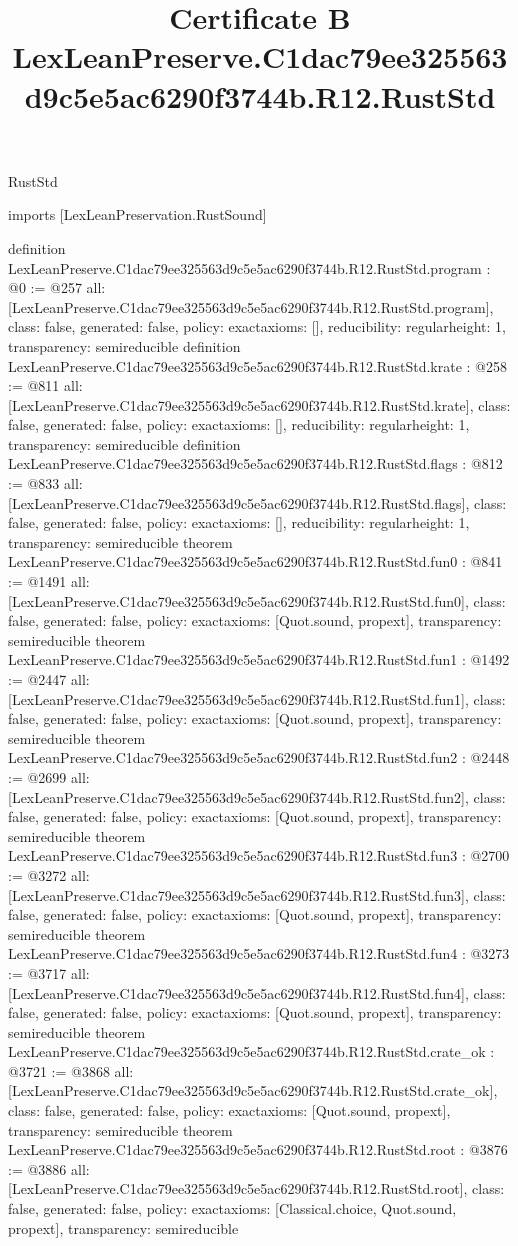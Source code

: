 \begin{lexlean}{RustStd}
\title{Certificate B LexLeanPreserve.C1dac79ee325563d9c5e5ac6290f3744b.R12.RustStd}
\begin{coremodule}
imports [LexLeanPreservation.RustSound]

definition LexLeanPreserve.C1dac79ee325563d9c5e5ac6290f3744b.R12.RustStd.program : @0 := @257 {
  all: [LexLeanPreserve.C1dac79ee325563d9c5e5ac6290f3744b.R12.RustStd.program],
  class: false,
  generated: false,
  policy: exact{axioms: []},
  reducibility: regular{height: 1},
  transparency: semireducible
}
definition LexLeanPreserve.C1dac79ee325563d9c5e5ac6290f3744b.R12.RustStd.krate : @258 := @811 {
  all: [LexLeanPreserve.C1dac79ee325563d9c5e5ac6290f3744b.R12.RustStd.krate],
  class: false,
  generated: false,
  policy: exact{axioms: []},
  reducibility: regular{height: 1},
  transparency: semireducible
}
definition LexLeanPreserve.C1dac79ee325563d9c5e5ac6290f3744b.R12.RustStd.flags : @812 := @833 {
  all: [LexLeanPreserve.C1dac79ee325563d9c5e5ac6290f3744b.R12.RustStd.flags],
  class: false,
  generated: false,
  policy: exact{axioms: []},
  reducibility: regular{height: 1},
  transparency: semireducible
}
theorem LexLeanPreserve.C1dac79ee325563d9c5e5ac6290f3744b.R12.RustStd.fun0 : @841 := @1491 {
  all: [LexLeanPreserve.C1dac79ee325563d9c5e5ac6290f3744b.R12.RustStd.fun0],
  class: false,
  generated: false,
  policy: exact{axioms: [Quot.sound, propext]},
  transparency: semireducible
}
theorem LexLeanPreserve.C1dac79ee325563d9c5e5ac6290f3744b.R12.RustStd.fun1 : @1492 := @2447 {
  all: [LexLeanPreserve.C1dac79ee325563d9c5e5ac6290f3744b.R12.RustStd.fun1],
  class: false,
  generated: false,
  policy: exact{axioms: [Quot.sound, propext]},
  transparency: semireducible
}
theorem LexLeanPreserve.C1dac79ee325563d9c5e5ac6290f3744b.R12.RustStd.fun2 : @2448 := @2699 {
  all: [LexLeanPreserve.C1dac79ee325563d9c5e5ac6290f3744b.R12.RustStd.fun2],
  class: false,
  generated: false,
  policy: exact{axioms: [Quot.sound, propext]},
  transparency: semireducible
}
theorem LexLeanPreserve.C1dac79ee325563d9c5e5ac6290f3744b.R12.RustStd.fun3 : @2700 := @3272 {
  all: [LexLeanPreserve.C1dac79ee325563d9c5e5ac6290f3744b.R12.RustStd.fun3],
  class: false,
  generated: false,
  policy: exact{axioms: [Quot.sound, propext]},
  transparency: semireducible
}
theorem LexLeanPreserve.C1dac79ee325563d9c5e5ac6290f3744b.R12.RustStd.fun4 : @3273 := @3717 {
  all: [LexLeanPreserve.C1dac79ee325563d9c5e5ac6290f3744b.R12.RustStd.fun4],
  class: false,
  generated: false,
  policy: exact{axioms: [Quot.sound, propext]},
  transparency: semireducible
}
theorem LexLeanPreserve.C1dac79ee325563d9c5e5ac6290f3744b.R12.RustStd.crate_ok : @3721 := @3868 {
  all: [LexLeanPreserve.C1dac79ee325563d9c5e5ac6290f3744b.R12.RustStd.crate_ok],
  class: false,
  generated: false,
  policy: exact{axioms: [Quot.sound, propext]},
  transparency: semireducible
}
theorem LexLeanPreserve.C1dac79ee325563d9c5e5ac6290f3744b.R12.RustStd.root : @3876 := @3886 {
  all: [LexLeanPreserve.C1dac79ee325563d9c5e5ac6290f3744b.R12.RustStd.root],
  class: false,
  generated: false,
  policy: exact{axioms: [Classical.choice, Quot.sound, propext]},
  transparency: semireducible
}


\end{coremodule}
\end{lexlean}
